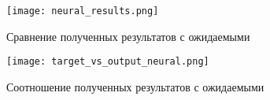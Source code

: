 \begin{figure}[!ht]
  \centering
  \texttt{[image: neural\_results.png]}
  \caption{Сравнение полученных результатов с ожидаемыми}
  \label{fig:experiment:neural_results}
\end{figure}

\begin{sidewaysfigure}
  \centering
  \texttt{[image: target\_vs\_output\_neural.png]}
  \caption{Соотношение полученных результатов с ожидаемыми}
  \label{fig:experiment:target_vs_output_neural}
\end{sidewaysfigure}


